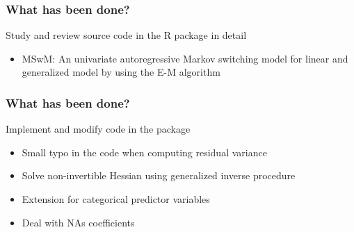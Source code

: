 \documentclass{beamer}
\begin{document}
\begin{frame}
\frametitle{What has been done?}
\begin{large}
	Study and review source code  in the R package in detail
	\begin{itemize}
		\item MSwM: An univariate autoregressive Markov switching model for linear and generalized model by using the E-M algorithm \cite{p3}
	\end{itemize}
\end{large}

\end{frame}

\begin{frame}
\frametitle{What has been done?}
Implement and modify code in the package
\begin{itemize}
	\setlength\itemsep{1em}
	\item Small typo in the code when computing residual variance
	\item Solve non-invertible Hessian using generalized inverse procedure \cite{p2}
	\item Extension for categorical predictor variables
	\item Deal with NAs coefficients
	
\end{itemize}
\end{frame}
\end{document}
